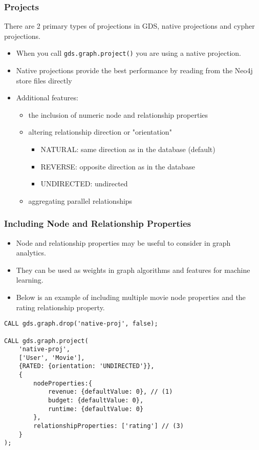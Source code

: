 \begin{frame}[fragile]\frametitle{Projects}

There are 2 primary types of projections in GDS, native projections and cypher projections.

\begin{itemize}

\item  When you call \lstinline|gds.graph.project()| you are using a native projection. 
\item Native projections provide the best performance by reading from the Neo4j store files directly
\item Additional features:
	\begin{itemize}
	\item the inclusion of numeric node and relationship properties
	\item altering relationship direction or "orientation"
		\begin{itemize}
			\item NATURAL: same direction as in the database (default)
			\item REVERSE: opposite direction as in the database
			\item UNDIRECTED: undirected
			\end{itemize}

	\item aggregating parallel relationships
	\end{itemize}
\end{itemize}

\end{frame}


\begin{frame}[fragile]\frametitle{Including Node and Relationship Properties}

\begin{itemize}
\item Node and relationship properties may be useful to consider in graph analytics. 
\item They can be used as weights in graph algorithms and features for machine learning.
\item Below is an example of including multiple movie node properties and the rating relationship property.
\end{itemize}

\begin{lstlisting}
CALL gds.graph.drop('native-proj', false);

CALL gds.graph.project(
    'native-proj',
    ['User', 'Movie'],
    {RATED: {orientation: 'UNDIRECTED'}},
    {
        nodeProperties:{
            revenue: {defaultValue: 0}, // (1)
            budget: {defaultValue: 0},
            runtime: {defaultValue: 0}
        },
        relationshipProperties: ['rating'] // (3)
    }
);
\end{lstlisting}

\end{frame}

